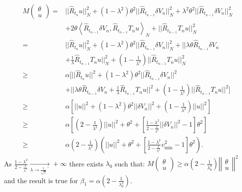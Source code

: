 \documentclass[a4paper,12pt,onecolumn]{article}
\begin{document}
\begin{align*}
M  \begin{pmatrix} \theta \\ u \end{pmatrix}
  = & ||\hat{R}_{t_n} u||_N^2 + (1-\lambda^2) \theta^2 || \hat{R}_{t_{n-1}}\delta V_n||_N^2 + \lambda^2 \theta^2 ||\hat{R}_{t_{n-1}}\delta V_n||_N^2  \\
 &+ 2\theta \left< \hat{R}_{t_{n-1}}\delta V_n, \hat{R}_{t_{n-1}} T_n u \right>_N + ||\hat{R}_{t_{n-1}} T_n u||_N^2 \\
  = & ||\hat{R}_{t_n} u||_N^2 + (1-\lambda^2) \theta^2 ||\hat{R}_{t_{n-1}}\delta V_n||_N^2 + ||\lambda \theta \hat{R}_{t_{n-1}}\delta V_n \\
 & + \frac{1}{\lambda} \hat{R}_{t_{n-1}} T_n u||_N^2 + (1-\frac{1}{\lambda^2}) ||\hat{R}_{t_{n-1}} T_n u||_N^2 \\
   \geq & \alpha \bigg[ ||\hat{R}_{t_n} u||^2 + (1-\lambda^2) \theta^2 ||\hat{R}_{t_{n-1}}\delta V_n||^2  \\
 &+ ||\lambda \theta \hat{R}_{t_{n-1}}\delta V_n + \frac{1}{\lambda} \hat{R}_{t_{n-1}} T_n u||^2 + (1-\frac{1}{\lambda^2}) ||\hat{R}_{t_{n-1}} T_n u||^2 \bigg] \\
     \geq & \alpha \left[ ||u||^2 + (1-\lambda^2) \theta^2 ||\delta V_n||^2 + (1-\frac{1}{\lambda^2}) ||u||^2 \right] \\
    \geq & \alpha \left[ ( 2-\frac{1}{\lambda^2})||u||^2 + \theta^2 + [\frac{1-\lambda^2}{2-\frac{1}{\lambda^2}} ||\delta V_n||^2-1] \theta^2 \right] \\
 \geq & \alpha (2-\frac{1}{\lambda^2}) \left( ||u||^2 + \theta^2 + [\frac{1-\lambda^2}{2-\frac{1}{\lambda^2}} v_{\min}^2-1] \theta^2 \right).
\end{align*}
As $ \frac{1-\lambda^2}{2-\frac{1}{\lambda^2}} \underset{\lambda \rightarrow \frac{1}{\sqrt{2}}^-}{\longrightarrow} +\infty $ there exists $\lambda_0$ such that:
$
{ M \begin{pmatrix}
\theta \\ u
\end{pmatrix} \geq \alpha \left( 2-\frac{1}{\lambda_0^2} \right) \left| \left| \begin{matrix}
\theta \\ u
\end{matrix} \right| \right|^2 }
$
and the result is true for $\beta_1 = \alpha (2-\frac{1}{\lambda_0^2})$.











\end{document}
